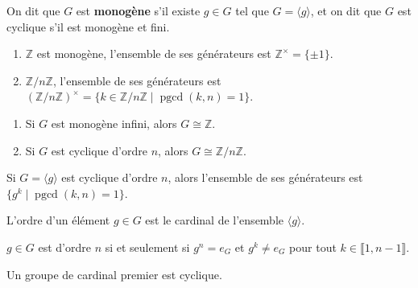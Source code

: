   \begin{definition}
    On dit que $G$ est \textbf{monogène} s'il existe $g \in G$ tel que $G = \langle g \rangle$, et on dit que $G$ est cyclique s'il est monogène et fini.
  \end{definition}

  \begin{example}
    \begin{enumerate}[label={\bfseries(\roman*)}]
      \item $\mathbb{Z}$ est monogène, l'ensemble de ses générateurs est $\mathbb{Z}^\times = \{ \pm 1 \}$.
      \item $\mathbb{Z}/n\mathbb{Z}$, l'ensemble de ses générateurs est $(\mathbb{Z}/n\mathbb{Z})^\times = \{ k \in \mathbb{Z}/n\mathbb{Z} \mid \operatorname{pgcd}(k,n) = 1 \}$.
    \end{enumerate}
  \end{example}

  \begin{theorem}
    \begin{enumerate}[label={\bfseries(\roman*)}]
      \item Si $G$ est monogène infini, alors $G \cong \mathbb{Z}$.
      \item Si $G$ est cyclique d'ordre $n$, alors $G \cong \mathbb{Z}/n\mathbb{Z}$.
    \end{enumerate}
  \end{theorem}

  \begin{corollary}
    Si $G = \langle g \rangle$ est cyclique d'ordre $n$, alors l'ensemble de ses générateurs est $\{ g^k \mid \operatorname{pgcd}(k,n) = 1 \}$.
  \end{corollary}


  \begin{definition}
    L'ordre d'un élément $g \in G$ est le cardinal de l'ensemble $\langle g \rangle$.
  \end{definition}

  \begin{remark}
    $g \in G$ est d'ordre $n$ si et seulement si $g^n = e_G$ et $g^k \neq e_G$ pour tout $k \in \llbracket 1,n-1 \rrbracket$.
  \end{remark}


  \begin{proposition}
    Un groupe de cardinal premier est cyclique.
  \end{proposition}

